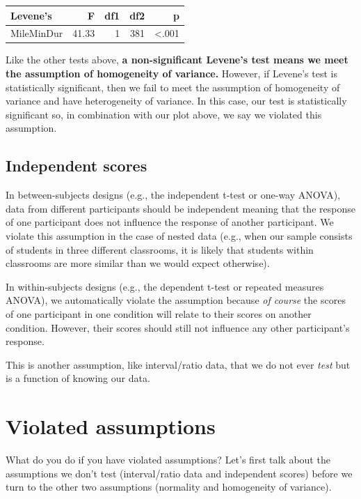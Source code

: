 \documentclass[
]{book}
\begin{document}
\begin{longtable}[]{@{}lrrrr@{}}
\toprule
Levene's & F & df1 & df2 & p\tabularnewline
\midrule
\endhead
MileMinDur & 41.33 & 1 & 381 & \textless.001\tabularnewline
\bottomrule
\end{longtable}

Like the other tests above, \textbf{a non-significant Levene's test means we meet the assumption of homogeneity of variance.} However, if Levene's test is statistically significant, then we fail to meet the assumption of homogeneity of variance and have heterogeneity of variance. In this case, our test is statistically significant so, in combination with our plot above, we say we violated this assumption.

\hypertarget{independent-scores}{%
\subsection{Independent scores}\label{independent-scores}}

In between-subjects designs (e.g., the independent t-test or one-way ANOVA), data from different participants should be independent meaning that the response of one participant does not influence the response of another participant. We violate this assumption in the case of nested data (e.g., when our sample consists of students in three different classrooms, it is likely that students within classrooms are more similar than we would expect otherwise).

In within-subjects designs (e.g., the dependent t-test or repeated measures ANOVA), we automatically violate the assumption because \emph{of course} the scores of one participant in one condition will relate to their scores on another condition. However, their scores should still not influence any other participant's response.

This is another assumption, like interval/ratio data, that we do not ever \emph{test} but is a function of knowing our data.

\hypertarget{violated-assumptions}{%
\section{Violated assumptions}\label{violated-assumptions}}

What do you do if you have violated assumptions? Let's first talk about the assumptions we don't test (interval/ratio data and independent scores) before we turn to the other two assumptions (normality and homogeneity of variance).
\end{document}
